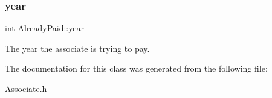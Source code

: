\mbox{\label{classAlreadyPaid_aca0124c0c69671e1452020fc8697c3ca}} 
\subsubsection{\texorpdfstring{year}{year}}
{\footnotesize\ttfamily int Already\+Paid\+::year\hspace{0.3cm}{\ttfamily [private]}}



The year the associate is trying to pay. 



The documentation for this class was generated from the following file\+:\begin{DoxyCompactItemize}
\item 
\mbox{\hyperlink{Associate_8h}{Associate.\+h}}\end{DoxyCompactItemize}
